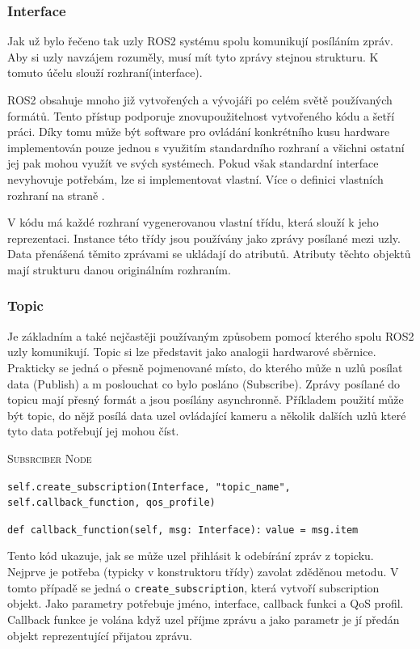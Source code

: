 \newpage
\subsubsection*{Interface}
Jak už bylo řečeno tak uzly ROS2 systému spolu komunikují posíláním zpráv. Aby si uzly navzájem rozuměly, musí mít tyto zprávy stejnou strukturu. K tomuto účelu slouží rozhraní(interface). 

ROS2 obsahuje mnoho již vytvořených a vývojáři po celém světě používaných formátů. Tento přístup podporuje znovupoužitelnost vytvořeného kódu a šetří práci. Díky tomu může být software pro ovládání konkrétního kusu hardware implementován pouze jednou s využitím standardního rozhraní a všichni ostatní jej pak mohou využít ve svých systémech. Pokud však standardní interface nevyhovuje potřebám, lze si implementovat vlastní.\cite{ros2_documentation} Více o definici vlastních rozhraní na straně \pageref{theory:custom_interfaces}.

V kódu má každé rozhraní vygenerovanou vlastní třídu, která slouží k jeho reprezentaci. Instance této třídy jsou používány jako zprávy posílané mezi uzly. Data přenášená těmito zprávami se ukládají do atributů. Atributy těchto objektů mají strukturu danou originálním rozhraním.

\subsubsection*{Topic}
Je základním a také nejčastěji používaným způsobem pomocí kterého spolu ROS2 uzly komunikují. Topic si lze představit jako analogii hardwarové sběrnice. Prakticky se jedná o přesně pojmenované místo, do kterého může n uzlů posílat data (Publish) a m poslouchat co bylo posláno (Subscribe). Zprávy posílané do topicu mají přesný formát a jsou posílány asynchronně. Příkladem použití může být topic, do nějž posílá data uzel ovládající kameru a několik dalších uzlů které tyto data potřebují jej mohou číst. \cite[str:~6]{ros2_introduction}

\begin{algorithm}[h!]
	\label{}
	\caption{\textsc{Subsrciber Node}}
	
	\DontPrintSemicolon
	\SetAlgoNoLine
	\SetNlSty{}{}{:}
	\SetNlSkip{-1.1em}
	
	\BlankLine \Indp\Indpp
	\texttt{self.create\_subscription(Interface, "topic\_name", self.callback\_function, qos\_profile)}\;
	
	\BlankLine
	\texttt{def callback\_function(self, msg: Interface):}\;
	\Indp\Indp
	\texttt{value = msg.item}\;
\end{algorithm}
Tento kód ukazuje, jak se může uzel přihlásit k odebírání zpráv z topicku. Nejprve je potřeba (typicky v konstruktoru třídy) zavolat zděděnou metodu. V tomto případě se jedná o \verb|create_subscription|, která vytvoří subscription objekt. Jako parametry potřebuje jméno, interface, callback funkci a QoS profil. Callback funkce je volána když uzel příjme zprávu a jako parametr je jí předán objekt reprezentující přijatou zprávu. \cite{ros2_documentation}

